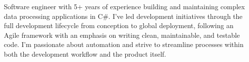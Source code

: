 \begin{justify}
Software engineer with 5+ years of experience building and maintaining complex data processing applications in C\#. I’ve led development initiatives through the full development lifecycle from conception to global deployment, following an Agile framework with an emphasis on writing clean, maintainable, and testable code. I’m passionate about automation and strive to streamline processes within both the development workflow and the product itself.
\end{justify}